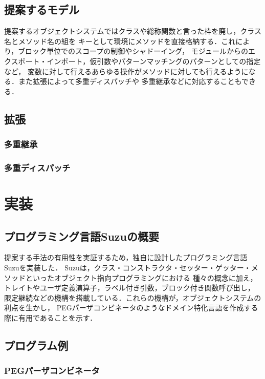 \documentclass{ipsjprosym}
\begin{document}
\subsection{提案するモデル}

提案するオブジェクトシステムではクラスや総称関数と言った枠を廃し，クラス名とメソッド名の組を
キーとして環境にメソッドを直接格納する．これにより，ブロック単位でのスコープの制御やシャドーイング，
モジュールからのエクスポート・インポート，仮引数やパターンマッチングのパターンとしての指定など，
変数に対して行えるあらゆる操作がメソッドに対しても行えるようになる．また拡張によって多重ディスパッチや
多重継承などに対応することもできる．

\subsection{拡張}

\subsubsection{多重継承}

\subsubsection{多重ディスパッチ}

\section{実装}

\subsection{プログラミング言語Suzuの概要}

提案する手法の有用性を実証するため，独自に設計したプログラミング言語Suzuを実装した．
Suzuは，クラス・コンストラクタ・セッター・ゲッター・メソッドといったオブジェクト指向プログラミングにおける
種々の概念に加え，トレイトやユーザ定義演算子，ラベル付き引数，ブロック付き関数呼び出し，
限定継続などの機構を搭載している．これらの機構が，オブジェクトシステムの利点を生かし，
PEGパーザコンビネータのようなドメイン特化言語を作成する際に有用であることを示す．

\subsection{プログラム例}

\subsubsection{PEGパーザコンビネータ}
\end{document}
